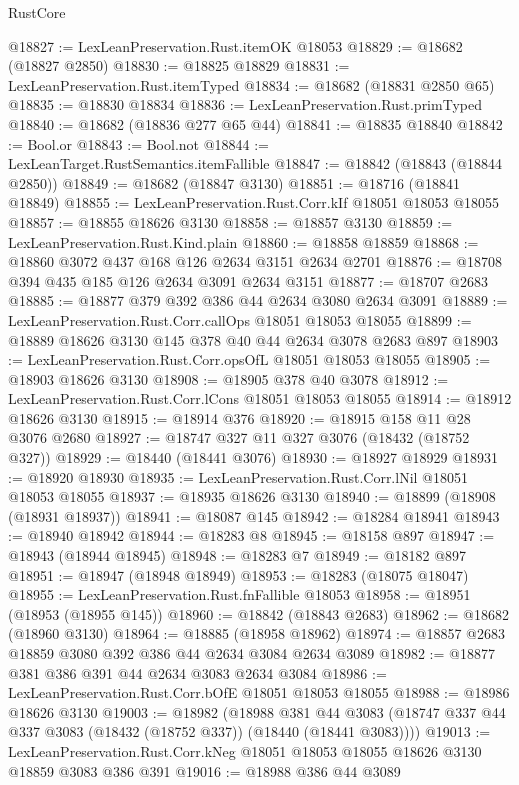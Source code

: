\begin{lexlean}{RustCore}
\begin{coremodule}
@18827 := LexLeanPreservation.Rust.itemOK @18053
@18829 := @18682 (@18827 @2850)
@18830 := @18825 @18829
@18831 := LexLeanPreservation.Rust.itemTyped
@18834 := @18682 (@18831 @2850 @65)
@18835 := @18830 @18834
@18836 := LexLeanPreservation.Rust.primTyped
@18840 := @18682 (@18836 @277 @65 @44)
@18841 := @18835 @18840
@18842 := Bool.or
@18843 := Bool.not
@18844 := LexLeanTarget.RustSemantics.itemFallible
@18847 := @18842 (@18843 (@18844 @2850))
@18849 := @18682 (@18847 @3130)
@18851 := @18716 (@18841 @18849)
@18855 := LexLeanPreservation.Rust.Corr.kIf @18051 @18053 @18055
@18857 := @18855 @18626 @3130
@18858 := @18857 @3130
@18859 := LexLeanPreservation.Rust.Kind.plain
@18860 := @18858 @18859
@18868 := @18860 @3072 @437 @168 @126 @2634 @3151 @2634 @2701
@18876 := @18708 @394 @435 @185 @126 @2634 @3091 @2634 @3151
@18877 := @18707 @2683
@18885 := @18877 @379 @392 @386 @44 @2634 @3080 @2634 @3091
@18889 := LexLeanPreservation.Rust.Corr.callOps @18051 @18053 @18055
@18899 := @18889 @18626 @3130 @145 @378 @40 @44 @2634 @3078 @2683 @897
@18903 := LexLeanPreservation.Rust.Corr.opsOfL @18051 @18053 @18055
@18905 := @18903 @18626 @3130
@18908 := @18905 @378 @40 @3078
@18912 := LexLeanPreservation.Rust.Corr.lCons @18051 @18053 @18055
@18914 := @18912 @18626 @3130
@18915 := @18914 @376
@18920 := @18915 @158 @11 @28 @3076 @2680
@18927 := @18747 @327 @11 @327 @3076 (@18432 (@18752 @327))
@18929 := @18440 (@18441 @3076)
@18930 := @18927 @18929
@18931 := @18920 @18930
@18935 := LexLeanPreservation.Rust.Corr.lNil @18051 @18053 @18055
@18937 := @18935 @18626 @3130
@18940 := @18899 (@18908 (@18931 @18937))
@18941 := @18087 @145
@18942 := @18284 @18941
@18943 := @18940 @18942
@18944 := @18283 @8
@18945 := @18158 @897
@18947 := @18943 (@18944 @18945)
@18948 := @18283 @7
@18949 := @18182 @897
@18951 := @18947 (@18948 @18949)
@18953 := @18283 (@18075 @18047)
@18955 := LexLeanPreservation.Rust.fnFallible @18053
@18958 := @18951 (@18953 (@18955 @145))
@18960 := @18842 (@18843 @2683)
@18962 := @18682 (@18960 @3130)
@18964 := @18885 (@18958 @18962)
@18974 := @18857 @2683 @18859 @3080 @392 @386 @44 @2634 @3084 @2634 @3089
@18982 := @18877 @381 @386 @391 @44 @2634 @3083 @2634 @3084
@18986 := LexLeanPreservation.Rust.Corr.bOfE @18051 @18053 @18055
@18988 := @18986 @18626 @3130
@19003 := @18982
    (@18988
      @381
      @44
      @3083
      (@18747 @337 @44 @337 @3083 (@18432 (@18752 @337)) (@18440 (@18441 @3083))))
@19013 := LexLeanPreservation.Rust.Corr.kNeg
    @18051
    @18053
    @18055
    @18626
    @3130
    @18859
    @3083
    @386
    @391
@19016 := @18988 @386 @44 @3089

\end{coremodule}
\end{lexlean}
